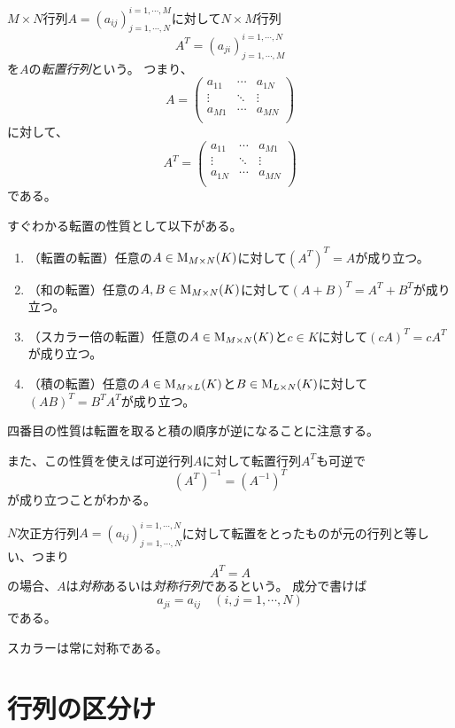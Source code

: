 \begin{definition}[転置行列]
$M\times N$行列$A = (a_{i j})^{i = 1, \cdots, M}_{j = 1, \cdots, N}$に対して$N\times M$行列
$$
A^T = (a_{j i})^{i = 1, \cdots, N}_{j = 1, \cdots, M}
$$
を$A$の\emph{転置行列}という。
つまり、
$$
A =
\begin{pmatrix}
a_{1 1} & \cdots & a_{1 N} \\
\vdots & \ddots & \vdots \\
a_{M 1} & \cdots & a_{M N} \\
\end{pmatrix}
$$
に対して、
$$
A^T =
\begin{pmatrix}
a_{1 1} & \cdots & a_{M 1} \\
\vdots & \ddots & \vdots \\
a_{1 N} & \cdots & a_{M N} \\
\end{pmatrix}
$$
である。
\end{definition}

すぐわかる転置の性質として以下がある。

\begin{enumerate}
\item
（転置の転置）任意の$A \in \mathrm{M}_{M\times N}(K)$に対して$(A^T)^T = A$が成り立つ。
\item
（和の転置）任意の$A, B \in \mathrm{M}_{M\times N}(K)$に対して$(A+B)^T = A^T+B^T$が成り立つ。
\item
（スカラー倍の転置）任意の$A \in \mathrm{M}_{M\times N}(K)$と$c \in K$に対して$(c A)^T = c A^T$が成り立つ。
\item
（積の転置）任意の$A \in \mathrm{M}_{M\times L}(K)$と$B \in \mathrm{M}_{L\times N}(K)$に対して$(A B)^T = B^T A^T$が成り立つ。
\end{enumerate}

四番目の性質は転置を取ると積の順序が逆になることに注意する。

また、この性質を使えば可逆行列$A$に対して転置行列$A^T$も可逆で
$$
(A^T)^{-1} = (A^{-1})^T
$$
が成り立つことがわかる。

\begin{definition}[対称行列]
$N$次正方行列$A = (a_{i j})^{i = 1, \cdots, N}_{j = 1, \cdots, N}$に対して転置をとったものが元の行列と等しい、つまり
$$
A^T = A
$$
の場合、$A$は\emph{対称}あるいは\emph{対称行列}であるという。
成分で書けば
$$
a_{j i} = a_{i j} \quad (i, j = 1, \cdots, N)
$$
である。
\end{definition}

スカラーは常に対称である。

\section{行列の区分け}

